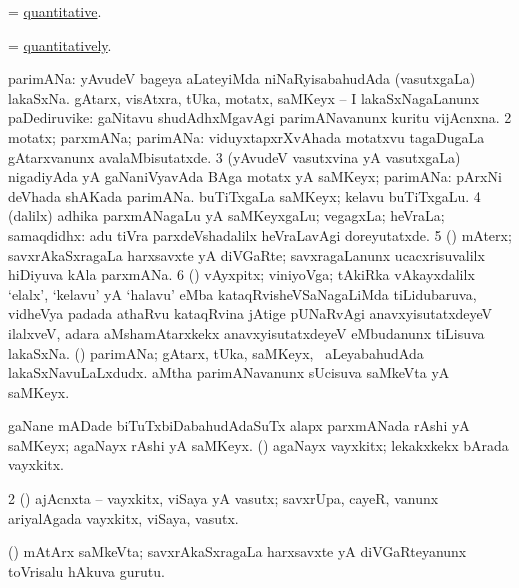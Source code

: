 \bentry
{}
\gl{\gu}
\bmng
= \hyperlink{quantitative}{quantitative}. 
\emng
\eentry

\bentry
{}
\gl{\kirxvi}
\bmng
= \hyperlink{quantitatively}{quantitatively}. 
\emng
\eentry

\bentry
{}
\gl{\nA}
\bmng
\bnum
{} parimANa: 
\banum
{} yAvudeV bageya aLateyiMda niNaRyisabahudAda (vasutxgaLa) lakaSxNa. 
 gAtarx, visAtxra, tUka, motatx, saMKeyx -- I lakaSxNagaLanunx paDediruvike:  gaNitavu shudAdhxMgavAgi parimANavanunx kuritu vijAcnxna. 
\eanum
\numie
\num{2} motatx; parxmANa; parimANa:  viduyxtapxrXvAhada motatxvu tagaDugaLa gAtarxvanunx avalaMbisutatxde. 
\num{3} (yAvudeV vasutxvina yA vasutxgaLa) nigadiyAda yA gaNaniVyavAda BAga motatx yA saMKeyx; parimANa:  pArxNi deVhada shAKada parimANa.  buTiTxgaLa saMKeyx; kelavu buTiTxgaLu. 
\num{4} (\bava dalilx) adhika parxmANagaLu yA saMKeyxgaLu; vegagxLa; heVraLa; samaqdidhx:  adu tiVra parxdeVshadalilx heVraLavAgi doreyutatxde. 
\num{5} (\CaM) mAterx; savxrAkaSxragaLa harxsavxte yA diVGaRte; savxragaLanunx ucacxrisuvalilx hiDiyuva kAla parxmANa. 
\num{6} (\takaR) vAyxpitx; viniyoVga; tAkiRka vAkayxdalilx `elalx', `kelavu' yA `halavu' eMba kataqRvisheVSaNagaLiMda tiLidubaruva, vidheVya padada athaRvu kataqRvina jAtige pUNaRvAgi anavxyisutatxdeyeV ilalxveV, adara aMshamAtarxkekx anavxyisutatxdeyeV eMbudanunx tiLisuva lakaSxNa. 
 (\ga) 
\banum
{} parimANa; gAtarx, tUka, saMKeyx, \mo\ aLeyabahudAda lakaSxNavuLaLxdudx. 
 aMtha parimANavanunx sUcisuva saMkeVta yA saMKeyx. 
\eanum
\numie
\enum
\emng

\noindent
\gl{\pagu}
\bmng
\bnum
{}  
\banum
{} gaNane mADade biTuTxbiDabahudAdaSuTx alapx parxmANada rAshi yA saMKeyx; agaNayx rAshi yA saMKeyx. 
 (\rUpa) agaNayx vayxkitx; lekakxkekx bArada vayxkitx. 
\eanum
\numie
\num{2}  (\rUpa) ajAcnxta -- vayxkitx, viSaya yA vasutx; savxrUpa, cayeR, \mo vanunx ariyalAgada vayxkitx, viSaya, vasutx. 
\enum
\emng
\eentry

\bentry
{}
\gl{\nA}
\bmng
(\CaM) mAtArx saMkeVta; savxrAkaSxragaLa harxsavxte yA diVGaRteyanunx toVrisalu hAkuva gurutu. 
\emng
\eentry

